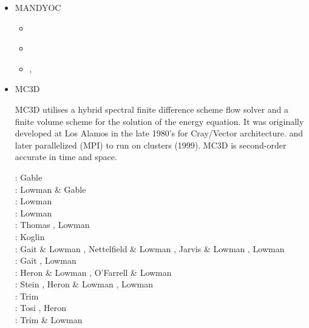\begin{itemize}
\item MANDYOC 

\begin{scriptsize}
\begin{itemize}
\item[\twothousandseventeen] \textcite{sace17}
\item[\twothousandtwentyone] \textcite{sasa21}
\item[\twothousandtwentytwo] \textcite{saap22}, \textcite{sisa22}
\end{itemize}
\end{scriptsize} 


\item MC3D 

MC3D utilises a hybrid spectral finite difference scheme flow
solver and a finite volume scheme for the solution of the energy equation.
It was originally developed at Los Alamos in the late 1980's for Cray/Vector architecture. 
and later parallelized (MPI) to run on clusters (1999).
MC3D is second-order accurate in time and space.

\begin{scriptsize}
\nineteenninetyone:  Gable \etal \cite{gaot91}\\
\nineteenninetynine:  Lowman \& Gable \cite{loga99}\\
\twothousandone:  Lowman \etal \cite{lokg01}\\
\twothousandthree:  Lowman \etal \cite{lokg03}\\
\twothousandfour:  Thomas \etal \cite{thkl04} , Lowman \etal \cite{lokg04} \\
\twothousandfive:  Koglin \etal \cite{kogk05} \\
\twothousandseven: Gait \& Lowman \cite{galo07,galo07b}, Nettelfield \& Lowman \cite{nelo07},
                   Jarvis \& Lowman \cite{jalo07}, Lowman \etal \cite{lopk07}\\
\twothousandeight: Gait \etal \cite{galg08}, Lowman \etal \cite{logg08}\\
\twothousandten: Heron \& Lowman \cite{helo10}, O'Farrell \& Lowman \cite{oflo10}\\
\twothousandeleven: Stein \etal \cite{stfl11}, Heron \& Lowman \cite{helo11}, Lowman \etal \cite{lokt11}\\
\twothousandfourteen: Trim \etal \cite{trhs14}\\
\twothousandfifteen: Tosi \etal \cite{tosn15}, Heron \etal \cite{hels15}\\
\twothousandsixteen: Trim \& Lowman \cite{trlo16}
\end{scriptsize} 


\end{itemize}
